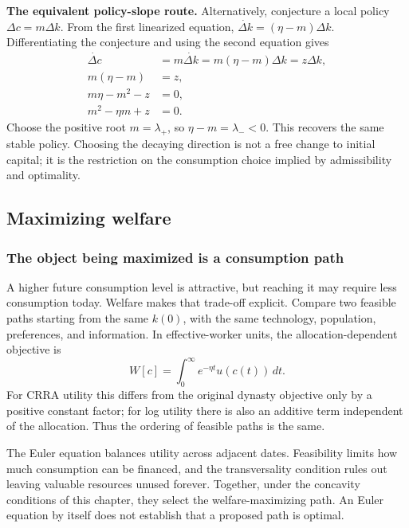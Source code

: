 \textbf{The equivalent policy-slope route.}
Alternatively, conjecture a local policy $\Delta c=m\Delta k$. From the first
linearized equation, $\dot{\Delta k}=(\eta-m)\Delta k$. Differentiating the
conjecture and using the second equation gives
\begin{equation}
\begin{aligned}
\dot{\Delta c}&=m\dot{\Delta k}=m(\eta-m)\Delta k=z\Delta k,\\
m(\eta-m)&=z,\\
m\eta-m^2-z&=0,\\
m^2-\eta m+z&=0.
\end{aligned}
\end{equation}
Choose the positive root $m=\lambda_+$, so $\eta-m=\lambda_-<0$. This recovers
the same stable policy. Choosing the decaying direction is not a free change
to initial capital; it is the restriction on the consumption choice implied
by admissibility and optimality.

\subsection{Maximizing welfare}\label{maximizing-welfare}

\subsubsection{The object being maximized is a consumption path}

A higher future consumption level is attractive, but reaching it may require
less consumption today. Welfare makes that trade-off explicit. Compare two
feasible paths starting from the same $k(0)$, with the same technology,
population, preferences, and information. In effective-worker units, the
allocation-dependent objective is
\begin{equation}
W[c]=\int_0^\infty e^{-\eta t}u(c(t))\,dt.
\end{equation}
For CRRA utility this differs from the original dynasty objective only by a
positive constant factor; for log utility there is also an additive term
independent of the allocation. Thus the ordering of feasible paths is the same.

The Euler equation balances utility across adjacent dates. Feasibility limits
how much consumption can be financed, and the transversality condition rules
out leaving valuable resources unused forever. Together, under the concavity
conditions of this chapter, they select the welfare-maximizing path. An Euler
equation by itself does not establish that a proposed path is optimal.

